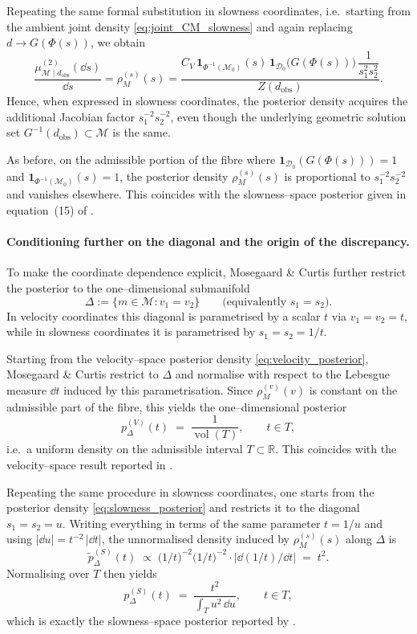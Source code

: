 \documentclass[11pt]{article}
\theoremstyle{remark}
\newcommand{\modelspace}{\mathcal{M}}
\newcommand{\dataspace}{\mathcal{D}}
\begin{document}
Repeating the same formal substitution in slowness coordinates, i.e.\ starting
from the ambient joint density \eqref{eq:joint_CM_slowness} and again replacing
\(d\to G(\Phi(s))\), we obtain
\begin{equation}
\label{eq:slowness_posterior}
\frac{\mu^{(2)}_{\modelspace\mid d_{\mathrm{obs}}}(\dd s)}{\dd s}
=
\rho_M^{(s)}(s)
=
\frac{C_V\,
\mathbf{1}_{\Phi^{-1}(\modelspace_0)}(s)\,
\mathbf{1}_{\dataspace_0}\!\bigl(G(\Phi(s))\bigr)\,
\dfrac{1}{s_1^{2}s_2^{2}}}
{Z(d_{\mathrm{obs}})} .
\end{equation}
Hence, when expressed in slowness coordinates, the posterior density acquires
the additional Jacobian factor \(s_1^{-2}s_2^{-2}\), even though the underlying
geometric solution set \(G^{-1}(d_{\mathrm{obs}})\subset\modelspace\) is the
same.

As before, on the admissible portion of the fibre where
\(\mathbf{1}_{\dataspace_0}(G(\Phi(s)))=1\) and
\(\mathbf{1}_{\Phi^{-1}(\modelspace_0)}(s)=1\), the posterior density
\(\rho_M^{(s)}(s)\) is proportional to \(s_1^{-2}s_2^{-2}\) and vanishes
elsewhere. This coincides with the slowness--space posterior given in
equation~(15) of \citet{MosegaardCurtis2024}.

\paragraph{Conditioning further on the diagonal and the origin of the discrepancy.}
To make the coordinate dependence explicit, Mosegaard \& Curtis further restrict
the posterior to the one--dimensional submanifold
\[
\Delta := \{m\in\modelspace : v_1=v_2\}
\qquad\text{(equivalently } s_1=s_2\text{).}
\]
In velocity coordinates this diagonal is parametrised by a scalar \(t\) via
\(v_1=v_2=t\), while in slowness coordinates it is parametrised by
\(s_1=s_2=1/t\).

Starting from the velocity--space posterior density
\eqref{eq:velocity_posterior}, Mosegaard \& Curtis restrict to \(\Delta\) and
normalise with respect to the Lebesgue measure \(\dd t\) induced by this
parametrisation. Since \(\rho_M^{(v)}(v)\) is constant on the admissible part of
the fibre, this yields the one--dimensional posterior
\[
p^{(V)}_\Delta(t)
\;=\;
\frac{1}{\operatorname{vol}(T)},
\qquad t\in T,
\]
i.e.\ a uniform density on the admissible interval \(T\subset\mathbb{R}\).
This coincides with the velocity--space result reported in
\citet[Appendix~A]{MosegaardCurtis2024}.

Repeating the same procedure in slowness coordinates, one starts from the
posterior density \eqref{eq:slowness_posterior} and restricts it to the diagonal
\(s_1=s_2=u\). Writing everything in terms of the same parameter \(t=1/u\) and
using \(|\dd u| = t^{-2}\,|\dd t|\), the unnormalised density induced by
\(\rho_M^{(s)}(s)\) along \(\Delta\) is
\[
\tilde p^{(S)}_\Delta(t)
\;\propto\;
\bigl(1/t\bigr)^{-2}\bigl(1/t\bigr)^{-2}\cdot\bigl|\dd(1/t)/\dd t\bigr|
\;=\;
t^{2}.
\]
Normalising over \(T\) then yields
\[
p^{(S)}_\Delta(t)
\;=\;
\frac{t^2}{\displaystyle\int_T u^2\,\dd u},
\qquad t\in T,
\]
which is exactly the slowness--space posterior reported by
\citet[Appendix~A]{MosegaardCurtis2024}.
\end{document}
